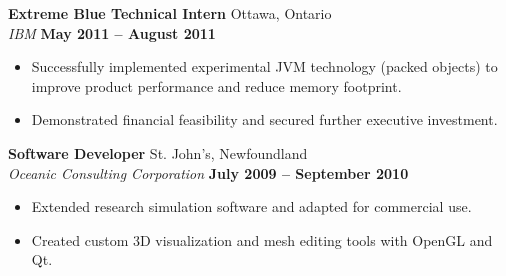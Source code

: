 \documentclass[margin,line]{res}
\begin{document}
\begin{resume}
        {\bf Extreme Blue Technical Intern} {\hfill Ottawa, Ontario}\\
      {\em IBM} \hfill {\bf May 2011 -- August 2011}
      \begin{itemize} \itemsep -2pt
	\item Successfully implemented experimental JVM technology (packed objects) to improve product performance and reduce memory footprint.
        \item Demonstrated financial feasibility and secured further executive investment.
      \end{itemize}
    

	{\bf Software Developer} {\hfill St. John's, Newfoundland}\\
      {\em Oceanic Consulting Corporation} \hfill {\bf July 2009 -- September 2010}
      \begin{itemize} \itemsep -2pt
        \item Extended research simulation software and adapted for commercial use.
        \item Created custom 3D visualization and mesh editing tools with OpenGL and Qt.
      \end{itemize}




\end{resume}
\end{document}
